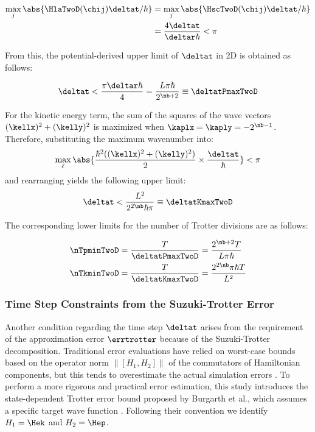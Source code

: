 \documentclass[manuscript_main.tex]{subfiles}
\begin{document}
\begin{align}
\max_{j}\abs{\HlaTwoD(\chij)\deltat/\hbar}
  &= \max_{j}\abs{\HscTwoD(\chij)\deltat/\hbar}\\
  &= \frac{4\deltat}{\deltar\hbar} < \pi
\end{align}

From this, the potential-derived upper limit of $\deltat$ in 2D is obtained as
follows:

\begin{equation}
\deltat < \frac{\pi\deltar\hbar}{4}
        =\frac{L\pi\hbar}{2^{\nb+2}}
        \equiv\deltatPmaxTwoD
 \label{eq:nyqist-limit-by-hep-final-2D}
\end{equation}

For the kinetic energy term, the sum of the squares of the wave vectors
$(\kellx)^2+(\kelly)^2$ is maximized when $\kaplx=\kaply=-2^{\nb-1}$. Therefore,
substituting the maximum wavenumber into:
\begin{equation}
\max_{\ell}\abs{\frac{\hbar^2((\kellx)^2+(\kelly)^2)}{2}\times\frac{\deltat}{\hbar}} < \pi
\end{equation}
and rearranging yields the following upper limit:
\begin{equation}
\deltat < \frac{L^2}{2^{2\nb}\hbar\pi} \equiv\deltatKmaxTwoD
 \label{eq:nyqist-limit-by-hek-final-2D}
\end{equation}

The corresponding lower limits for the number of Trotter divisions are as follows:

\begin{align}
    \nTpminTwoD &= \frac{T}{\deltatPmaxTwoD}=\frac{2^{\nb+2}T}{L\pi\hbar} \\
    \nTkminTwoD &= \frac{T}{\deltatKmaxTwoD}=\frac{2^{2\nb}\pi\hbar T}{L^2}
\end{align}

\subsubsection{Time Step Constraints from the Suzuki-Trotter Error}
\label{subsubsec:time-step-constraints-from-suzuki-trotter-error}

Another condition regarding the time step $\deltat$ arises from the requirement
of the approximation error $\errtrotter$ because of the Suzuki-Trotter
decomposition. Traditional error evaluations have relied on worst-case bounds
based on the operator norm $\| [H_1,H_2] \|$ of the commutators of Hamiltonian
components, but this tends to overestimate the actual simulation errors
\cite{Childs2021.PhysRevX.11.011020}. To perform a more rigorous and practical
error estimation, this study introduces the state-dependent Trotter error bound
proposed by Burgarth et al., which assumes a specific target wave function
\cite{Burgarth2024.PhysRevResearch.6.043155}.  Following their convention we
identify $H_1=\Hek$ and $H_2=\Hep$.
\end{document}
